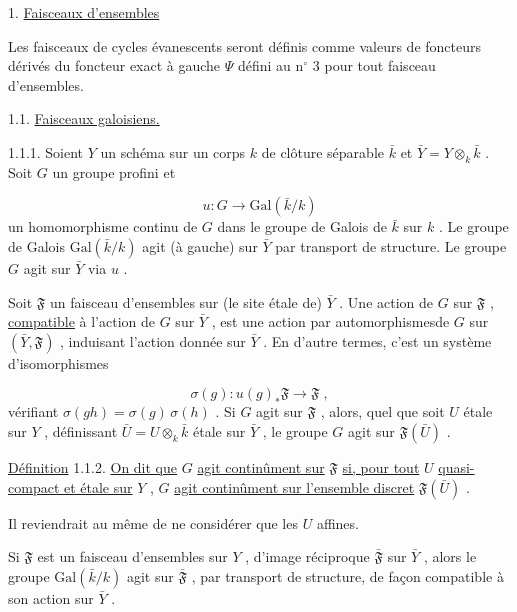 

1. \underline{Faisceaux d'ensembles}

Les faisceaux de cycles évanescents seront définis comme valeurs de foncteurs dérivés du foncteur exact à gauche $\Psi$ défini au n$^{\circ}$ 3 pour tout faisceau d'ensembles.


1.1. \underline{Faisceaux galoisiens.}

1.1.1. Soient $Y$ un schéma sur un corps $k$ de clôture séparable $\bar{k}$ et $\bar{Y} = Y \otimes_{k} \bar{k}$ . Soit $G$ un groupe profini et

\begin{equation*}
u : G \longrightarrow \mathrm{Gal}(\bar{k}/k)
\end{equation*}
un homomorphisme continu de $G$ dans le groupe de Galois de $\bar{k}$ sur $k$ . Le groupe de Galois $\mathrm{Gal}(\bar{k}/k)$ agit (à gauche) sur $\bar{Y}$ par transport de structure. Le groupe $G$ agit sur $\bar{Y}$ via $u$ .

Soit $\mathfrak{F}$ un faisceau d'ensembles sur (le site étale de) $\bar{Y}$ . Une action de $G$ sur $\mathfrak{F}$ , \underline{compatible} à l'action de $G$ sur $\bar{Y}$ , est une action par automorphismesde $G$ sur $(\bar{Y}, \mathfrak{F} )$ , induisant l'action donnée sur $\bar{Y}$ . En d'autre termes, c'est un système d'isomorphismes

\begin{equation*}
\sigma(g) : u(g)_{*} \mathfrak{F} \longrightarrow \mathfrak{F} \;,
\end{equation*}
vérifiant $\sigma(gh) = \sigma(g)\, \sigma(h)$ . Si $G$ agit sur $\mathfrak{F}$ , alors, quel que soit $U$ étale sur $Y$ , définissant $\bar{U} = U \otimes_{k} \bar{k}$ étale sur $\bar{Y}$ , le groupe $G$ agit sur $\mathfrak{F}(\bar{U})$ .

\underline{Définition} 1.1.2. \underline{On dit que} $G$ \underline{agit continûment sur} $\mathfrak{F}$ \underline{si, pour tout} $U$ \underline{quasi-compact et étale sur} $Y$ , $G$ \underline{agit continûment sur l'ensemble discret} $\mathfrak{F}(\bar{U})$ .

Il reviendrait au même de ne considérer que les $U$ affines.

Si $\mathfrak{F}$ est un faisceau d'ensembles sur $Y$ , d'image réciproque $\bar{\mathfrak{F}}$ sur $\bar{Y}$ , alors le groupe $\mathrm{Gal}(\bar{k}/k)$ agit sur $\bar{\mathfrak{F}}$ , par transport de structure, de façon compatible à son action sur $\bar{Y}$ .

